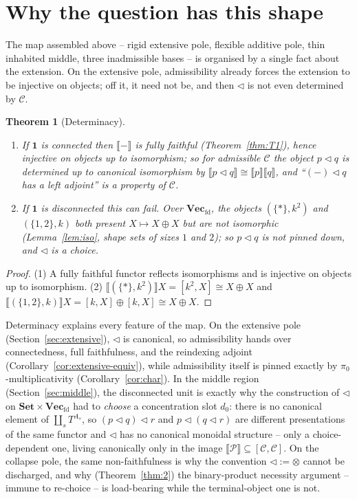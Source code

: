 \documentclass[11pt]{amsart}
\theoremstyle{plain}
\newtheorem{theorem}{Theorem}[section]
\theoremstyle{definition}
\newcommand{\C}{\mathcal{C}}
\newcommand{\ext}[1]{\llbracket #1 \rrbracket}
\newcommand{\Setb}{\mathbf{Set}}
\newcommand{\Vecfd}{\mathbf{Vec}_{\mathrm{fd}}}
\newcommand{\comp}{\mathbin{\triangleleft}}
\newcommand{\one}{\mathbf{1}}
\newcommand{\pizero}{\pi_0}
\begin{document}
\section{Why the question has this shape}\label{sec:determinacy}

The map assembled above -- rigid extensive pole, flexible additive pole, thin inhabited middle,
three inadmissible bases -- is organised by a single fact about the extension. On the extensive pole,
admissibility already forces the extension to be injective on objects; off it, it need not be, and
then $\comp$ is not even determined by $\C$.

\begin{theorem}[Determinacy]\label{thm:determinacy}
\begin{enumerate}[leftmargin=2em]
\item If $\one$ is connected then $\ext{-}$ is fully faithful (Theorem~\ref{thm:T1}), hence injective
on objects up to isomorphism; so for admissible $\C$ the object $p\comp q$ is determined up to
canonical isomorphism by $\ext{p\comp q}\cong\ext p\ext q$, and ``$({-})\comp q$ has a left adjoint''
is a property of $\C$.
\item If $\one$ is disconnected this can fail. Over $\Vecfd$, the objects $(\{*\},k^2)$ and
$(\{1,2\},k)$ both present $X\mapsto X\oplus X$ but are not isomorphic (Lemma~\ref{lem:iso}, shape sets
of sizes $1$ and $2$); so $p\comp q$ is not pinned down, and $\comp$ is a \emph{choice}.
\end{enumerate}
\end{theorem}
\begin{proof}
(1) A fully faithful functor reflects isomorphisms and is injective on objects up to isomorphism.
(2) $\ext{(\{*\},k^2)}X=[k^2,X]\cong X\oplus X$ and $\ext{(\{1,2\},k)}X=[k,X]\oplus[k,X]\cong X\oplus
X$.
\end{proof}

Determinacy explains every feature of the map. On the extensive pole (Section~\ref{sec:extensive}),
$\comp$ is canonical, so admissibility hands over connectedness, full faithfulness, and the reindexing
adjoint (Corollary~\ref{cor:extensive-equiv}), while admissibility itself is pinned exactly by
$\pizero$-multiplicativity (Corollary~\ref{cor:char}). In the middle region (Section~\ref{sec:middle}), the
disconnected unit is exactly why the construction of $\comp$ on $\Setb\times\Vecfd$ had to
\emph{choose} a concentration slot $d_0$: there is no canonical element of $\coprod_s T^{A_s}$, so
$(p\comp q)\comp r$ and $p\comp(q\comp r)$ are different presentations of the same functor and $\comp$
has no canonical monoidal structure -- only a choice-dependent one, living canonically only in the
image $\ext{\mathcal P}\subseteq[\C,\C]$. On the collapse pole, the same non-faithfulness is why the
convention $\comp:=\otimes$ cannot be discharged, and why (Theorem~\ref{thm:2}) the binary-product
necessity argument -- immune to re-choice -- is load-bearing while the terminal-object one is not.
\end{document}
